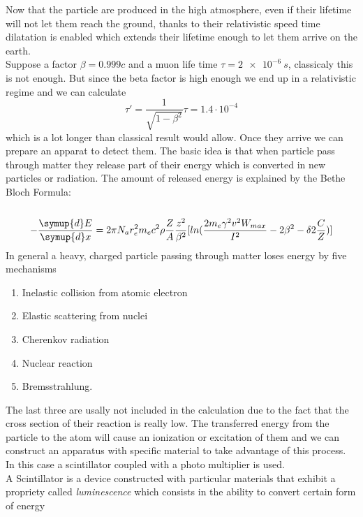 Now that the particle are produced in the high atmosphere, even if their lifetime will not let
them reach the ground, thanks to their relativistic speed time dilatation is enabled which
extends their lifetime enough to let them arrive on the earth.\\
Suppose a factor $\beta = 0.999c$ and a muon life time $\tau = \SI{2e-6}{s}$, 
classicaly this is not enough. But since the beta factor is high enough we end up in a
relativistic regime and we can calculate
\begin{equation*}
\tau '  = \frac {1}{\sqrt{1- \beta ^2}} \tau = 1.4 \cdot 10^{-4}
\end{equation*}
which is a lot longer than classical result would allow. 
Once they arrive we can prepare an apparat to detect them.
The basic idea is that when particle pass through matter they release part of their energy which
is converted in new particles or radiation. The amount of released energy is explained by the
Bethe Bloch Formula:\\\\
\begin{equation*}
-\frac {\symup{d}E}{\symup{d}x} = 2 \pi N_a r_{e}^{2}m_{e}c^{2}\rho \frac{Z}{A} \frac {z^{2}}{\beta^{2}} [ ln(\frac{2m_{e} \gamma^{2} v^{2} W_{max}}{I^{2}}  - 2 \beta^{2} - \delta 2 \frac {C}{Z})]
\end{equation*}
In general a heavy, charged particle passing through matter loses energy by five mechanisms
\begin{enumerate}
    \item Inelastic collision from atomic electron
    \item Elastic scattering from nuclei
    \item Cherenkov radiation
    \item Nuclear reaction
    \item Bremsstrahlung.
\end{enumerate}
The last three are usally not included in the calculation due to the fact that the 
cross section of their reaction is really low. The transferred energy from the particle 
to the atom will cause an ionization or excitation of them and we can construct an apparatus
with specific material to take advantage of this process. In this case a scintillator
coupled with a photo multiplier is used.\\
A Scintillator is a device constructed with particular materials that exhibit a propriety 
called \textit{luminescence} which consists in the ability to convert certain form of energy
